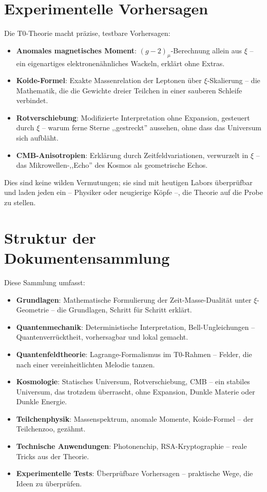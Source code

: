 	\section{Experimentelle Vorhersagen}
	
	Die T0-Theorie macht präzise, testbare Vorhersagen:
	
	\begin{foundation}
		\begin{itemize}
			\item \textbf{Anomales magnetisches Moment}: $(g-2)_\mu$-Berechnung allein aus $\xi$ – ein eigenartiges elektronenähnliches Wackeln, erklärt ohne Extras.
			\item \textbf{Koide-Formel}: Exakte Massenrelation der Leptonen über $\xi$-Skalierung – die Mathematik, die die Gewichte dreier Teilchen in einer sauberen Schleife verbindet.
			\item \textbf{Rotverschiebung}: Modifizierte Interpretation ohne Expansion, gesteuert durch $\xi$ – warum ferne Sterne ,,gestreckt'' aussehen, ohne dass das Universum sich aufbläht.
			\item \textbf{CMB-Anisotropien}: Erklärung durch Zeitfeldvariationen, verwurzelt in $\xi$ – das Mikrowellen-,,Echo'' des Kosmos als geometrische Echos.
		\end{itemize}
	\end{foundation}
	
	Dies sind keine wilden Vermutungen; sie sind mit heutigen Labors überprüfbar und laden jeden ein – Physiker oder neugierige Köpfe –, die Theorie auf die Probe zu stellen.
	
	\section{Struktur der Dokumentensammlung}
	
	Diese Sammlung umfasst:
	
	\begin{itemize}
		\item \textbf{Grundlagen}: Mathematische Formulierung der Zeit-Masse-Dualität unter $\xi$-Geometrie – die Grundlagen, Schritt für Schritt erklärt.
		\item \textbf{Quantenmechanik}: Deterministische Interpretation, Bell-Ungleichungen – Quantenverrücktheit, vorhersagbar und lokal gemacht.
		\item \textbf{Quantenfeldtheorie}: Lagrange-Formalismus im T0-Rahmen – Felder, die nach einer vereinheitlichten Melodie tanzen.
		\item \textbf{Kosmologie}: Statisches Universum, Rotverschiebung, CMB – ein stabiles Universum, das trotzdem überrascht, ohne Expansion, Dunkle Materie oder Dunkle Energie.
		\item \textbf{Teilchenphysik}: Massenspektrum, anomale Momente, Koide-Formel – der Teilchenzoo, gezähmt.
		\item \textbf{Technische Anwendungen}: Photonenchip, RSA-Kryptographie – reale Tricks aus der Theorie.
		\item \textbf{Experimentelle Tests}: Überprüfbare Vorhersagen – praktische Wege, die Ideen zu überprüfen.
	\end{itemize}
	

